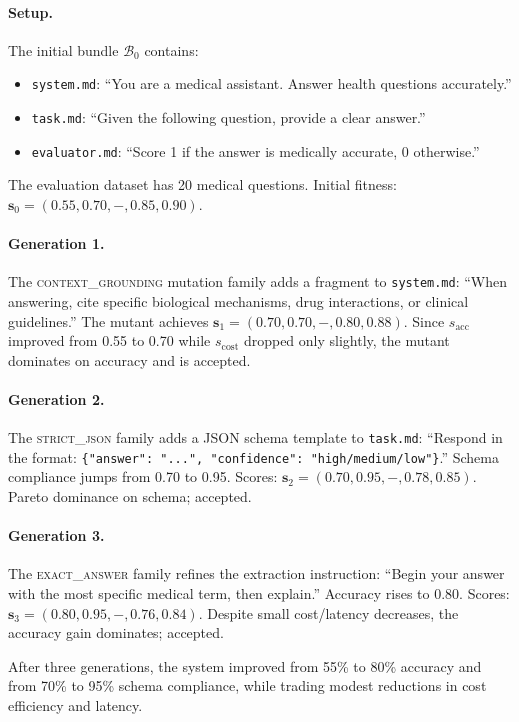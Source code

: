 \paragraph{Setup.} The initial bundle $\mathcal{B}_0$ contains:
\begin{itemize}[leftmargin=1.5em]
  \item \texttt{system.md}: ``You are a medical assistant. Answer health questions accurately.''
  \item \texttt{task.md}: ``Given the following question, provide a clear answer.''
  \item \texttt{evaluator.md}: ``Score 1 if the answer is medically accurate, 0 otherwise.''
\end{itemize}
The evaluation dataset has 20 medical questions. Initial fitness: $\mathbf{s}_0 = (0.55, 0.70, -, 0.85, 0.90)$.

\paragraph{Generation 1.} The \textsc{context\_grounding} mutation family adds a fragment to \texttt{system.md}: ``When answering, cite specific biological mechanisms, drug interactions, or clinical guidelines.'' The mutant achieves $\mathbf{s}_1 = (0.70, 0.70, -, 0.80, 0.88)$. Since $s_{\text{acc}}$ improved from 0.55 to 0.70 while $s_{\text{cost}}$ dropped only slightly, the mutant dominates on accuracy and is accepted.

\paragraph{Generation 2.} The \textsc{strict\_json} family adds a JSON schema template to \texttt{task.md}: ``Respond in the format: \texttt{\{"answer": "...", "confidence": "high/medium/low"\}}.'' Schema compliance jumps from 0.70 to 0.95. Scores: $\mathbf{s}_2 = (0.70, 0.95, -, 0.78, 0.85)$. Pareto dominance on schema; accepted.

\paragraph{Generation 3.} The \textsc{exact\_answer} family refines the extraction instruction: ``Begin your answer with the most specific medical term, then explain.'' Accuracy rises to 0.80. Scores: $\mathbf{s}_3 = (0.80, 0.95, -, 0.76, 0.84)$. Despite small cost/latency decreases, the accuracy gain dominates; accepted.

After three generations, the system improved from 55\% to 80\% accuracy and from 70\% to 95\% schema compliance, while trading modest reductions in cost efficiency and latency.

